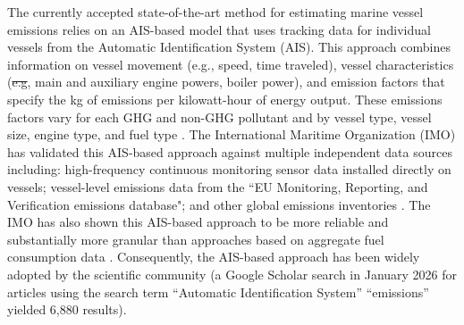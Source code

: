 \documentclass[lineno,pdflatex,sn-nature]{sn-jnl}
\makeatletter
\providecommand{\DIFadd}[1]{{\protect\color{blue}\uwave{#1}}} %
\providecommand{\DIFdel}[1]{{\protect\color{red}\sout{#1}}} %
\providecommand{\DIFaddbegin}{} %
\providecommand{\DIFaddend}{} %
\providecommand{\DIFdelbegin}{} %
\providecommand{\DIFdelend}{} %
\providecommand{\DIFscaledelfig}{0.5}
\newlength{\DIFdelgraphicswidth} %
\newlength{\DIFdelgraphicsheight} %
\providecommand{\DIFaddincludegraphics}[2][]{{\color{blue}\fbox{\DIFOincludegraphics[#1]{#2}}}} %
\providecommand{\DIFdelincludegraphics}[2][]{%
\sbox{\DIFdelgraphicsbox}{\DIFOincludegraphics[#1]{#2}}%
\settoboxwidth{\DIFdelgraphicswidth}{\DIFdelgraphicsbox} %
\settoboxtotalheight{\DIFdelgraphicsheight}{\DIFdelgraphicsbox} %
\scalebox{\DIFscaledelfig}{%
\parbox[b]{\DIFdelgraphicswidth}{\usebox{\DIFdelgraphicsbox}\\[-\baselineskip] \rule{\DIFdelgraphicswidth}{0em}}\llap{\resizebox{\DIFdelgraphicswidth}{\DIFdelgraphicsheight}{%
\setlength{\unitlength}{\DIFdelgraphicswidth}%
\begin{picture}(1,1)%
\thicklines\linethickness{2pt} %
{\color[rgb]{1,0,0}\put(0,0){\framebox(1,1){}}}%
{\color[rgb]{1,0,0}\put(0,0){\line( 1,1){1}}}%
{\color[rgb]{1,0,0}\put(0,1){\line(1,-1){1}}}%
\end{picture}%
}\hspace*{3pt}}} %
} %
\DeclareRobustCommand{\DIFaddbegin}{\DIFOaddbegin \let\includegraphics\DIFaddincludegraphics} %
\DeclareRobustCommand{\DIFaddend}{\DIFOaddend \let\includegraphics\DIFOincludegraphics} %
\DeclareRobustCommand{\DIFdelbegin}{\DIFOdelbegin \let\includegraphics\DIFdelincludegraphics} %
\DeclareRobustCommand{\DIFdelend}{\DIFOaddend \let\includegraphics\DIFOincludegraphics} %
\let\sout@orig\sout %
\renewcommand{\sout}[1]{\ifmmode\text{\sout@orig{\ensuremath{#1}}}\else\sout@orig{#1}\fi} %
\makeatother
\begin{document}
The currently accepted state-of-the-art method for estimating marine vessel emissions relies on an AIS-based model that uses tracking data for individual vessels from the Automatic Identification System (AIS). This approach combines information on vessel movement (e.g., speed, time traveled), vessel characteristics (\DIFdelbegin \DIFdel{e.g}\DIFdelend \DIFaddbegin \DIFadd{e.g.}\DIFaddend , main and auxiliary engine powers, boiler power), and emission factors that specify the kg of emissions per kilowatt-hour of energy output. These emissions factors vary for each GHG and non-GHG pollutant and by vessel type, vessel size, engine type, and fuel type \cite{olmer2017greenhouse, fourth2020greenhouse}. The International Maritime Organization (IMO) has validated this AIS-based approach against multiple independent data sources including: high-frequency continuous monitoring sensor data installed directly on vessels; vessel-level emissions data from the ``EU Monitoring, Reporting, and Verification emissions database"; and other global emissions inventories \cite{fourth2020greenhouse}. The IMO has also shown this AIS-based approach to be more reliable and substantially more granular than approaches based on aggregate fuel consumption data \cite{fourth2020greenhouse}. Consequently, the AIS-based approach has been widely adopted by the scientific community (a Google Scholar search in January 2026 for articles using the search term ``Automatic Identification System'' ``emissions'' yielded 6,880 results). 
\end{document}
